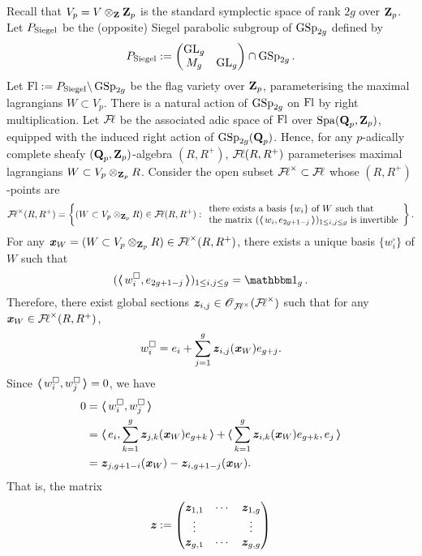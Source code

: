 Recall that $V_p=V\otimes_{\Z}\Z_p$ is the standard symplectic space of rank $2g$ over $\Z_p$. Let $P_{\Siegel}$ be the (opposite) Siegel parabolic subgroup of $\GSp_{2g}$ defined by \[P_{\Siegel}:=\begin{pmatrix}\GL_g \\ M_g & \GL_g\end{pmatrix}\cap \GSp_{2g}.\] Let $\Fl:=P_{\Siegel}\backslash\GSp_{2g}$ be the flag variety over $\Z_p$, parameterising the maximal lagrangians $W\subset V_p$. There is a natural action of $\GSp_{2g}$ on $\Fl$ by right multiplication. Let $\adicFL$ be the associated adic space of $\Fl$ over $\Spa(\Q_p, \Z_p)$, equipped with the induced right action of $\GSp_{2g}(\Q_p)$. Hence, for any $p$-adically complete sheafy $(\Q_p, \Z_p)$-algebra $(R, R^+)$, $\adicFL(R, R^+)$ parameterises maximal lagrangians $W\subset V_p\otimes_{\Z_p}R$. Consider the open subset $\adicFL^{\times}\subset \adicFL$ whose $(R, R^+)$-points are $$\adicFL^{\times}(R, R^+)=\left\{(W\subset V_p\otimes_{\Z_p}R)\in \adicFL(R, R^+):\begin{array}{l}
    \text{there exists a basis $\{w_i\}$ of $W$ such that}  \\
    \text{the matrix $(\bla w_i, e_{2g+1-j}\bra)_{1\leq i,j\leq g}$ is invertible}     
\end{array} \right\}.$$ For any $\bfitx_W=(W\subset V_p\otimes_{\Z_p}R)\in \adicFL^\times(R, R^+)$, there exists a unique basis $\{w_i^{\square}\}$ of $W$ such that \[(\bla w_i^{\square}, e_{2g+1-j}\bra)_{1\leq i,j\leq g}=\one_g.\] Therefore, there exist global sections $\bfitz_{i,j}\in \scrO_{\adicFL^\times}(\adicFL^\times)$ such that for any $\bfitx_{W}\in \adicFL^\times(R, R^+)$, $$w_i^{\square}=e_{i}+\sum_{j=1}^{g}\bfitz_{i,j}(\bfitx_W)e_{g+j}.$$ Since $\bla w_i^{\square}, w_j^{\square}\bra= 0$, we have \begin{align*}
    0 & = \bla w_i^{\square}, w_j^{\square}\bra\\
    & = \bla e_{i}, \sum_{k=1}^g\bfitz_{j,k}(\bfitx_W)e_{g+k}\bra + \bla \sum_{k=1}^g\bfitz_{i,k}(\bfitx_W)e_{g+k}, e_{j}\bra\\ 
    & = \bfitz_{j,g+1-i}(\bfitx_W)-\bfitz_{i,g+1-j}(\bfitx_W).
\end{align*} That is, the matrix $$\bfitz:=\begin{pmatrix}
\bfitz_{1,1} & \cdots & \bfitz_{1,g}\\
\vdots & & \vdots\\
\bfitz_{g,1} & \cdots & \bfitz_{g,g}
\end{pmatrix}$$ 
